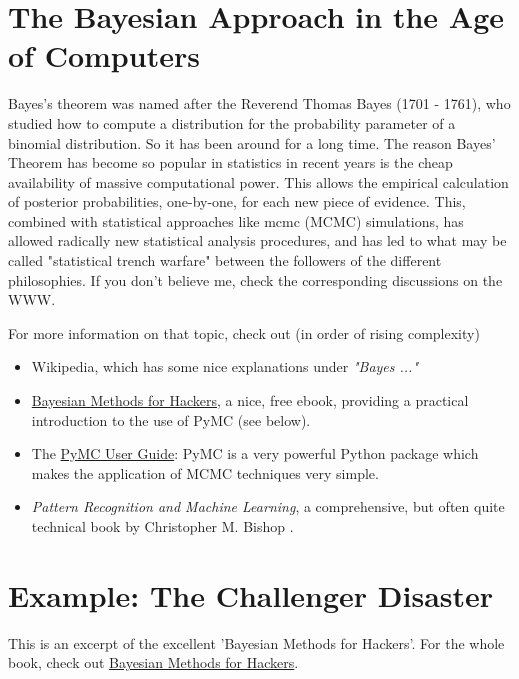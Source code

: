 \section{The Bayesian Approach in the Age of Computers}

Bayes's theorem was named after the Reverend Thomas Bayes (1701 - 1761), who studied how to compute a distribution for the probability parameter of a binomial distribution. So it has been around for a long time. The reason Bayes' Theorem has become so popular in statistics in recent years is the cheap availability of massive computational power. This allows the empirical calculation of posterior probabilities, one-by-one, for each new piece of evidence. This, combined with statistical approaches like \acrfull{mcmc} (MCMC) simulations, has allowed radically new statistical analysis procedures, and has led to what may be called "statistical trench warfare" between the followers of the different philosophies. If you don't believe me, check the corresponding discussions on the WWW.

For more information on that topic, check out (in order of rising complexity)

\begin{itemize}
  \item Wikipedia, which has some nice explanations under \emph{"Bayes ..."}
  \item \href{http://camdavidsonpilon.github.io/Probabilistic-Programming-and-Bayesian-Methods-for-Hackers/}{Bayesian Methods for Hackers}, a nice, free ebook, providing a practical introduction to the use of PyMC (see below).
  \item The \href{http://pymc-devs.github.io/pymc/}{PyMC User Guide}: PyMC is a very powerful Python package which makes the application of MCMC techniques very simple.
  \item \emph{Pattern Recognition and Machine Learning}, a comprehensive, but often quite technical book by Christopher M. Bishop \cite{Bishop2007}.
\end{itemize}

\section{Example: The Challenger Disaster}

This is an excerpt of the excellent 'Bayesian Methods for Hackers'. For the whole book, check out \href{http://camdavidsonpilon.github.io/Probabilistic-Programming-and-Bayesian-Methods-for-Hackers/}{Bayesian Methods for Hackers}.

